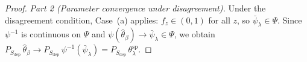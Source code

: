 \begin{proof}
    \emph{Part 2 (Parameter convergence under disagreement).} 
    Under the disagreement condition, Case~(a) applies: 
    $f_z \in (0,1)$ for all $z$, so 
    $\bar{\psi}_\lambda \in \Psi$. Since $\psi^{-1}$ is continuous 
    on $\Psi$ and 
    $\psi(\hat\theta_\beta) \to \bar{\psi}_\lambda \in \Psi$, 
    we obtain 
    $P_{S_{\mathrm{dep}}}\,\hat\theta_\beta 
    \to P_{S_{\mathrm{dep}}}\,\psi^{-1}(\bar{\psi}_\lambda) 
    = P_{S_{\mathrm{dep}}}\,\theta^{\mathrm{sp}}_\lambda$.
\end{proof}


